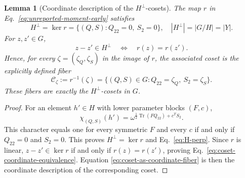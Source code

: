 \documentclass[11pt]{article}
\newcommand{\Tr}{\operatorname{Tr}}
\newcommand{\1}{\mathbf 1}
\theoremstyle{plain}
\newtheorem{lemma}[theorem]{Lemma}
\theoremstyle{definition}
\theoremstyle{remark}
\begin{document}
\begin{lemma}[Coordinate description of the $H^\perp$-cosets]
\label{lem:unreported-moment-cosets}
The map $r$ in Eq.~\eqref{eq:unreported-moment-early} satisfies
\begin{equation}
 H^\perp=\ker r
 =\{(Q,S):Q_{22}=0,\ S_2=0\},
 \quad |H^\perp|=|G/H|=\lvert Y\rvert.
 \label{eq:H-perp}
\end{equation}
For $z,z'\in G$,
\begin{equation}
 z-z'\in H^\perp
 \quad\Longleftrightarrow\quad
 r(z)=r(z').
 \label{eq:coset-coordinate-equivalence}
\end{equation}
Hence, for every $\zeta=(\zeta_Q,\zeta_S)$ in the image of $r$, the associated
coset is the explicitly defined fiber
\begin{equation}
 \mathcal C_{\zeta}:=r^{-1}(\zeta)
 =\{(Q,S)\in G:Q_{22}=\zeta_Q,\ S_2=\zeta_S\}.
 \label{eq:coset-as-coordinate-fiber}
\end{equation}
These fibers are exactly the $H^\perp$-cosets in $G$.
\end{lemma}
\begin{proof}
For an element $h'\in H$ with lower parameter blocks $(F,c)$,
\begin{equation}
 \chi_{(Q,S)}(h')
 =\omega^{\frac12\Tr(FQ_{22})+c^TS_2}.
 \label{eq:annihilator-lower-block-pairing}
\end{equation}
This character equals one for every symmetric $F$ and every $c$ if and only if
$Q_{22}=0$ and $S_2=0$.  This proves $H^\perp=\ker r$ and
Eq.~\eqref{eq:H-perp}.  Since $r$ is linear,
$z-z'\in\ker r$ if and only if $r(z)=r(z')$, proving
Eq.~\eqref{eq:coset-coordinate-equivalence}.  Equation
\eqref{eq:coset-as-coordinate-fiber} is then the coordinate description of
the corresponding coset.
\end{proof}
\end{document}
